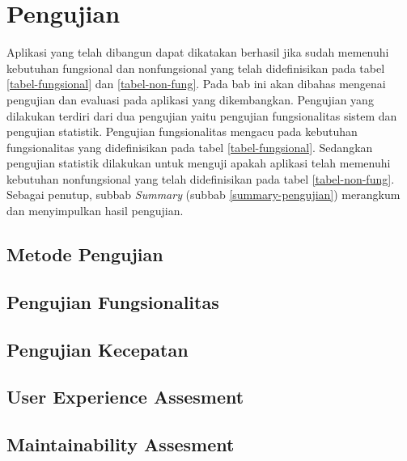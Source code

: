 \section{Pengujian}
	Aplikasi yang telah dibangun dapat dikatakan berhasil jika sudah memenuhi kebutuhan fungsional dan nonfungsional yang telah didefinisikan pada tabel \ref{tabel-fungsional} dan \ref{tabel-non-fung}. Pada bab ini akan dibahas mengenai pengujian dan evaluasi pada aplikasi yang dikembangkan. Pengujian yang dilakukan terdiri dari dua pengujian yaitu pengujian fungsionalitas sistem dan pengujian statistik. Pengujian fungsionalitas mengacu pada kebutuhan fungsionalitas yang didefinisikan pada tabel \ref{tabel-fungsional}. Sedangkan pengujian statistik dilakukan untuk menguji apakah aplikasi telah memenuhi kebutuhan nonfungsional yang telah didefinisikan pada tabel \ref{tabel-non-fung}. Sebagai penutup, subbab \textit{Summary} (subbab \ref{summary-pengujian}) merangkum dan menyimpulkan hasil pengujian.

	
	\subsection{Metode Pengujian}
	
		
	\subsection{Pengujian Fungsionalitas}
	\label{uji-fungsional}
	
	
	\subsection{Pengujian Kecepatan}
	\label{uji-performa}
	
	
	\subsection{User Experience Assesment}
	\label{[uji-ux}
	
	
	\subsection{Maintainability Assesment}
	\label{uji-maintainability}
	
	
	
		
		
